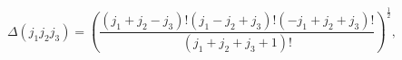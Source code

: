 \[\Delta(j_{1}j_{2}j_{3})=\left(\frac{(j_{1}+j_{2}-j_{3})!(j_{1}-j_{2}+j_{3})!(-%
j_{1}+j_{2}+j_{3})!}{(j_{1}+j_{2}+j_{3}+1)!}\right)^{\frac{1}{2}},\]